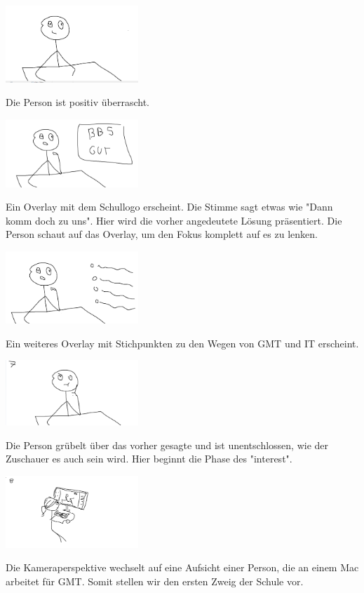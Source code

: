 \documentclass[8pt, letterpaper]{article}
\begin{document}
\includegraphics[width=5cm]{scene_4}

Die Person ist positiv überrascht.

\includegraphics[width=5cm]{scene_5}

Ein Overlay mit dem Schullogo erscheint. Die Stimme sagt etwas wie "Dann komm doch zu uns". Hier wird die vorher angedeutete Lösung präsentiert. Die Person schaut auf das Overlay, um den Fokus komplett auf es zu lenken.

\includegraphics[width=5cm]{scene_6}

Ein weiteres Overlay mit Stichpunkten zu den Wegen von GMT und IT erscheint.

\includegraphics[width=5cm]{scene_7}

Die Person grübelt über das vorher gesagte und ist unentschlossen, wie der Zuschauer es auch sein wird. Hier beginnt die Phase des "interest".

\includegraphics[width=5cm]{scene_8}

Die Kameraperspektive wechselt auf eine Aufsicht einer Person, die an einem Mac arbeitet für GMT. Somit stellen wir den ersten Zweig der Schule vor.
\end{document}

